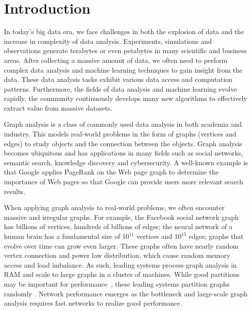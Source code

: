 \chapter{Introduction}
\label{sec:intro}

In today's big data era, we face challenges in both the explosion of
data and the increase in complexity of data analysis. Experiments,
simulations and observations generate terabytes or
even petabytes in many scientific and business areas. After collecting
a massive amount of data, we often need to perform complex data analysis
and machine learning techniques to gain insight from the data. These data
analysis tasks exhibit various data access and computation patterns. Furthermore,
the fields of data analysis and machine learning evolve rapidly. the community
continuously develops many new algorithms to effectively extract value from
massive datasets.

Graph analysis is a class of commonly used data analysis in both academia and
industry. This models
real-world problems in the form of graphs (vertices and edges) to study objects
and the connection between the objects. Graph analysis becomes ubiquitous
and has applications in many fields such as social networks, semantic search,
knowledge discovery and cybersecurity. A well-known example is that Google
applies PageRank \cite{pagerank} on the Web page graph to determine the importance
of Web pages so that Google can provide users more relevant search results.

When applying graph analysis to real-world problems, we often encounter
massive and irregular graphs. For example, the Facebook social network graph
has billions of vertices, hundreds of billions of edges; the neural network
of a human brain has a fundamental size of $10^{11}$ vertices and $10^{15}$ edges;
graphs that evolve over time can grow even larger. These graphs often have
nearly random vertex connection and power law distribution, which cause random
memory access and load imbalance. As such, leading systems process graph analysis
in RAM and scale to large graphs in a cluster of machines. While good partitions
may be important for performance~\cite{surfer}, these leading systems partition
graphs randomly \cite{powergraph}. Network performance emerges as the bottleneck
and large-scale graph analysis requires fast networks to realize good performance.

